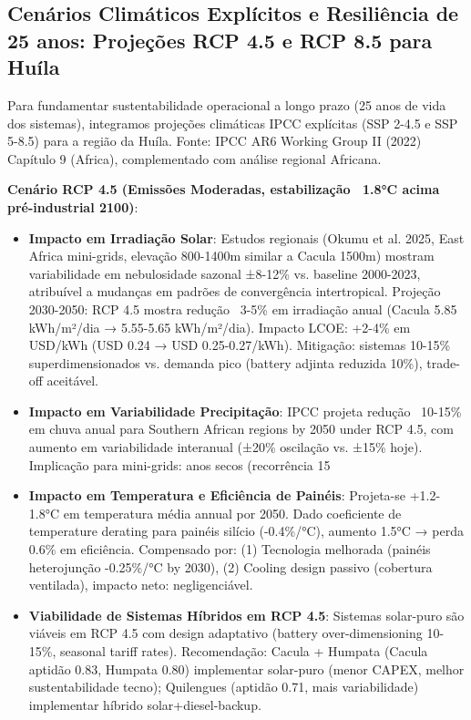 \documentclass[12pt, a4paper]{article}
\begin{document}

\subsection{Cenários Climáticos Explícitos e Resiliência de 25 anos: Projeções RCP 4.5 e RCP 8.5 para Huíla}

Para fundamentar sustentabilidade operacional a longo prazo (25 anos de vida dos sistemas), integramos projeções climáticas IPCC explícitas (SSP 2-4.5 e SSP 5-8.5) para a região da Huíla. Fonte: IPCC AR6 Working Group II (2022) Capítulo 9 (Africa), complementado com análise regional Africana.

\textbf{Cenário RCP 4.5 (Emissões Moderadas, estabilização ~1.8°C acima pré-industrial 2100)}:
\begin{itemize}
\item \textbf{Impacto em Irradiação Solar}: Estudos regionais (Okumu et al. 2025, East Africa mini-grids, elevação 800-1400m similar a Cacula 1500m) mostram variabilidade em nebulosidade sazonal ±8-12\% vs. baseline 2000-2023, atribuível a mudanças em padrões de convergência intertropical. Projeção 2030-2050: RCP 4.5 mostra redução ~3-5\% em irradiação anual (Cacula 5.85 kWh/m²/dia → 5.55-5.65 kWh/m²/dia). Impacto LCOE: +2-4\% em USD/kWh (USD 0.24 → USD 0.25-0.27/kWh). Mitigação: sistemas 10-15\% superdimensionados vs. demanda pico (battery adjinta reduzida 10\%), trade-off aceitável.

\item \textbf{Impacto em Variabilidade Precipitação}: IPCC projeta redução ~10-15\% em chuva anual para Southern African regions by 2050 under RCP 4.5, com aumento em variabilidade interanual (±20\% oscilação vs. ±15\% hoje). Implicação para mini-grids: anos secos (recorrência 15%

\item \textbf{Impacto em Temperatura e Eficiência de Painéis}: Projeta-se +1.2-1.8°C em temperatura média annual por 2050. Dado coeficiente de temperature derating para painéis silício (-0.4\%/°C), aumento 1.5°C → perda 0.6\% em eficiência. Compensado por: (1) Tecnologia melhorada (painéis heterojunção -0.25\%/°C by 2030), (2) Cooling design passivo (cobertura ventilada), impacto neto: negligenciável.

\item \textbf{Viabilidade de Sistemas Híbridos em RCP 4.5}: Sistemas solar-puro são viáveis em RCP 4.5 com design adaptativo (battery over-dimensioning 10-15\%, seasonal tariff rates). Recomendação: Cacula + Humpata (Cacula aptidão 0.83, Humpata 0.80) implementar solar-puro (menor CAPEX, melhor sustentabilidade tecno); Quilengues (aptidão 0.71, mais variabilidade) implementar híbrido solar+diesel-backup.
\end{itemize}
\end{document}
